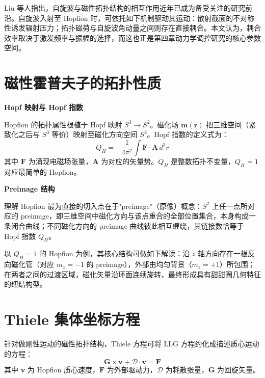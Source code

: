 Liu 等人\cite{liu2020three}指出，自旋波与磁性拓扑结构的相互作用近年已成为备受关注的研究前沿。自旋波入射至 Hopfion 时，可依托如下机制驱动其运动：散射截面的不对称性诱发辐射压力；拓扑磁荷与自旋波角动量之间则存在直接耦合。本文认为，耦合效率取决于激发频率与振幅的选择，而这也正是第四章动力学调控研究的核心参数空间。


\section{磁性霍普夫子的拓扑性质}

\par\noindent\textbf{Hopf 映射与 Hopf 指数}\par\nobreak

Hopfion 的拓扑属性根植于 Hopf 映射 $S^3 \to S^2$。磁化场 $\mathbf{m}(\mathbf{r})$ 把三维空间（紧致化之后与 $S^3$ 等价）映射至磁化方向空间 $S^2$。Hopf 指数的定义式为：
\begin{equation}
  Q_H = -\frac{1}{4\pi^2} \int \mathbf{F} \cdot \mathbf{A} \, d^3r
  \label{eq:hopf-index}
\end{equation}
其中 $\mathbf{F}$ 为涌现电磁场张量，$\mathbf{A}$ 为对应的矢量势。$Q_H$ 是整数拓扑不变量，$Q_H = 1$ 对应最简单的 Hopfion。

\par\noindent\textbf{Preimage 结构}\par\nobreak

理解 Hopfion 最为直接的切入点在于"preimage"（原像）概念：$S^2$ 上任一点所对应的 preimage，即三维空间中磁化方向与该点重合的全部位置集合，本身构成一条闭合曲线；不同磁化方向的 preimage 曲线彼此相互缠绕，其链接数恰等于 Hopf 指数 $Q_H$。

以 $Q_H = 1$ 的 Hopfion 为例，其核心结构可做如下解读：沿 $z$ 轴方向存在一根反向磁化管（对应 $m_z = -1$ 的 preimage），外部由均匀背景（$m_z = +1$）所包围；在两者之间的过渡区域，磁化矢量沿环面连续旋转，最终形成具有甜甜圈几何特征的纽结构型。


\section{Thiele 集体坐标方程}

针对做刚性运动的磁性拓扑结构，Thiele 方程可将 LLG 方程约化成描述质心运动的方程：
\begin{equation}
  \mathbf{G} \times \mathbf{v} + \mathcal{D} \cdot \mathbf{v} = \mathbf{F}
  \label{eq:thiele}
\end{equation}
其中 $\mathbf{v}$ 为 Hopfion 质心速度，$\mathbf{F}$ 为外部驱动力，$\mathcal{D}$ 为耗散张量，$\mathbf{G}$ 为回旋矢量。

